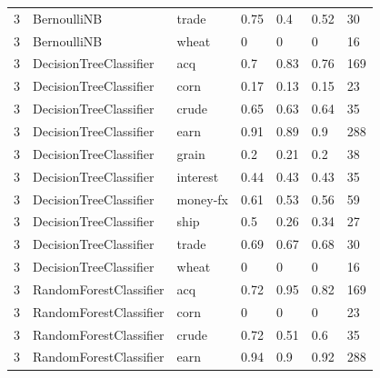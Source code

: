 \documentclass{article}
\begin{document}
\begin{table}[h]
\begin{tabular}{lllllll}
3             & BernoulliNB            & trade           & 0.75               & 0.4             & 0.52              & 30               \\
3             & BernoulliNB            & wheat           & 0                  & 0               & 0                 & 16               \\
3             & DecisionTreeClassifier & acq             & 0.7                & 0.83            & 0.76              & 169              \\
3             & DecisionTreeClassifier & corn            & 0.17               & 0.13            & 0.15              & 23               \\
3             & DecisionTreeClassifier & crude           & 0.65               & 0.63            & 0.64              & 35               \\
3             & DecisionTreeClassifier & earn            & 0.91               & 0.89            & 0.9               & 288              \\
3             & DecisionTreeClassifier & grain           & 0.2                & 0.21            & 0.2               & 38               \\
3             & DecisionTreeClassifier & interest        & 0.44               & 0.43            & 0.43              & 35               \\
3             & DecisionTreeClassifier & money-fx        & 0.61               & 0.53            & 0.56              & 59               \\
3             & DecisionTreeClassifier & ship            & 0.5                & 0.26            & 0.34              & 27               \\
3             & DecisionTreeClassifier & trade           & 0.69               & 0.67            & 0.68              & 30               \\
3             & DecisionTreeClassifier & wheat           & 0                  & 0               & 0                 & 16               \\
3             & RandomForestClassifier & acq             & 0.72               & 0.95            & 0.82              & 169              \\
3             & RandomForestClassifier & corn            & 0                  & 0               & 0                 & 23               \\
3             & RandomForestClassifier & crude           & 0.72               & 0.51            & 0.6               & 35               \\
3             & RandomForestClassifier & earn            & 0.94               & 0.9             & 0.92              & 288              \\\end{tabular}
\end{table}
\end{document}
